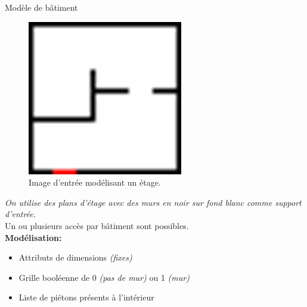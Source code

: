 \documentclass[11pt]{beamer}
\begin{document}
\begin{frame}{Modèle de bâtiment}

\begin{figure}
	\includegraphics[scale=0.2]{little-room.png}
	\caption{\tiny Image d'entrée modélisant un étage.}
\end{figure}

\textit{On utilise des plans d'étage avec des murs en noir sur fond blanc comme support d'entrée.}\\
Un ou plusieurs accès par bâtiment sont possibles.\\
\vspace{0.5cm}
\textbf{\large Modélisation:}
\begin{itemize}
\item Attributs de dimensions \textit{(fixes)}
\item Grille booléenne de 0 \textit{(pas de mur)} ou 1 \textit{(mur)}
\item Liste de piétons présents à l'intérieur
\end{itemize}
\end{frame}    
    
\end{document}
